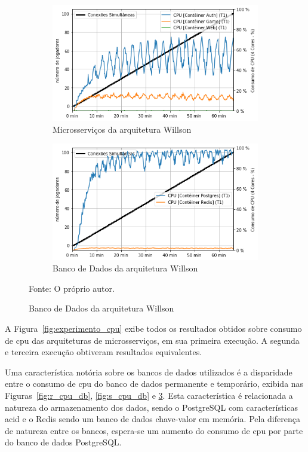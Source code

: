\begin{figure}[htb!]
        \begin{subfigure}{.5\textwidth}
        \centering
        \includegraphics[width=.95\linewidth]{figuras/testes/w_cpu_game.png}
        \caption{Microsserviços da arquitetura Willson}
        \label{fig:w_cpu_game}
    \end{subfigure}%
    \begin{subfigure}{.5\textwidth}
        \centering
        \includegraphics[width=.95\linewidth]{figuras/testes/w_cpu_db.png}
        \caption{Banco de Dados da arquitetura Willson}
        \label{fig:w_cpu_db}
    \end{subfigure}%

    Fonte: O próprio autor.
\end{figure}



A Figura~\ref{fig:experimento_cpu} exibe todos os resultados obtidos sobre consumo de \ac{cpu} das arquiteturas de microsserviços, em sua primeira execução.
%
A segunda e terceira execução obtiveram resultados equivalentes.



Uma característica notória sobre os bancos de dados utilizados é a disparidade entre o consumo de \ac{cpu} do banco de dados permanente e temporário, exibida nas Figuras~\ref{fig:r_cpu_db}, \ref{fig:s_cpu_db} e \ref{fig:w_cpu_db}.
%
Esta característica é relacionada a natureza do armazenamento dos dados, sendo o PostgreSQL com características \ac{acid} e o Redis sendo um banco de dados chave-valor em memória.
%
Pela diferença de natureza entre os bancos, espera-se um aumento do consumo de \ac{cpu} por parte do banco de dados PostgreSQL.

